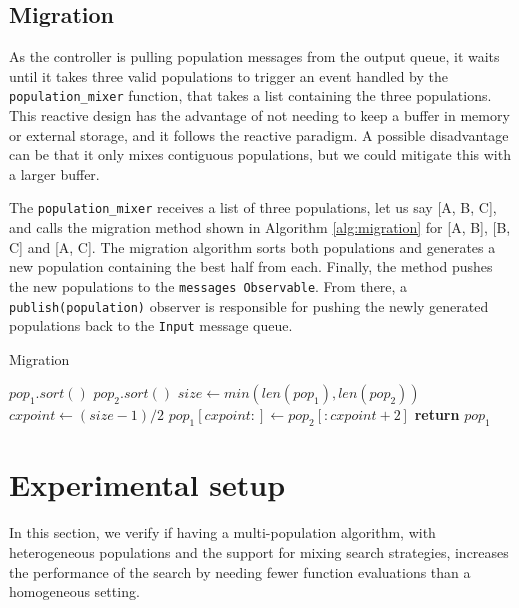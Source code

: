 \subsection{Migration}
\label{migration}

As the controller is pulling population messages from the output queue, it waits
until it takes three valid populations to trigger an event handled by the
\texttt{population\_mixer}  function, that takes a list containing the three
populations. This reactive design has the advantage of not needing to keep a
buffer in memory or external storage, and it follows the reactive paradigm. A
possible disadvantage can be that it only mixes contiguous populations, but we
could mitigate this with a larger buffer.

The \texttt{population\_mixer} receives a list of three populations, let us say
[A, B, C], and calls the migration method shown in Algorithm \ref{alg:migration}
for [A, B], [B, C] and [A, C]. The migration algorithm sorts both populations
and generates a new population containing the best half from each. Finally, the
method pushes the new populations to the \texttt{messages Observable}. From
there, a \texttt{publish(population)} observer is responsible for pushing the
newly generated populations back to the \texttt{Input} message queue.

\begin{algorithm}
    \caption{Migration}
    \label{alg:migration}
    \begin{algorithmic}[1]
            \State $pop_1.sort()$
            \State $pop_2.sort()$
            \State $size\gets min(len(pop_1), len(pop_2))$
            \State $cxpoint\gets (size-1)/2$
            \State $pop_1[cxpoint:]\gets pop_2[:cxpoint+2]$
            \State \textbf{return} $pop_1$
        \EndProcedure 
    \end{algorithmic}
\end{algorithm}

\section{Experimental setup}
\label{setup}

In this section, we verify if having a multi-population algorithm, with
heterogeneous populations and the support for mixing search strategies,
increases the performance of the search by needing fewer function evaluations
than a homogeneous setting.

